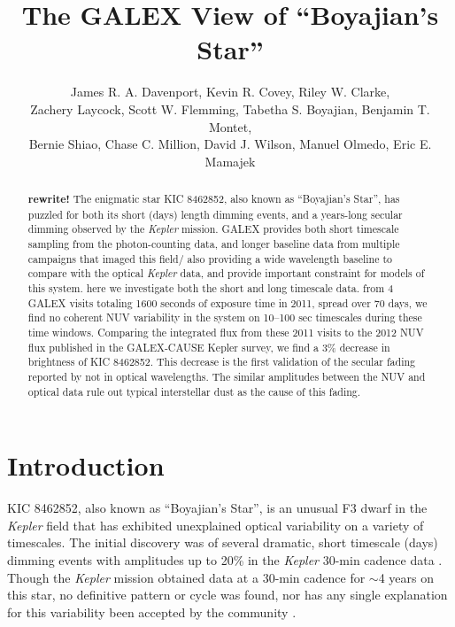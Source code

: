 \documentclass[twocolumn]{aastex6}
\newcommand{\Kepler}{\textsl{Kepler}\xspace}
\begin{document}
\title{The GALEX View of ``Boyajian's Star''}


\author{
	James R. A. Davenport,
	Kevin R. Covey,
	Riley W. Clarke, \\
	Zachery Laycock,
	Scott W. Flemming,
	Tabetha S. Boyajian,
	Benjamin T. Montet,\\
	Bernie Shiao,
	Chase C. Million,
	David J. Wilson,
	Manuel Olmedo,
	Eric E. Mamajek
	}

 

 

\begin{abstract}
{\bf rewrite!}
The enigmatic star KIC 8462852, also known as ``Boyajian's Star'',  has puzzled for both its short (days) length dimming events, and a years-long secular dimming observed by the \Kepler mission.
GALEX provides both short timescale sampling from the photon-counting data, and longer baseline data from multiple campaigns that imaged this field/ also providing a wide wavelength baseline to compare with the optical \Kepler data, and provide important constraint for models of this system.
here we investigate both the short and long timescale data. from 4 GALEX visits totaling 1600 seconds of exposure time in 2011, spread over 70 days, we find no coherent NUV variability in the system on 10--100 sec timescales during these time windows. Comparing the integrated flux from these 2011 visits to the 2012 NUV flux published in the GALEX-CAUSE Kepler survey, we find a 3\% decrease in brightness of KIC 8462852. This decrease is the first  validation of the secular fading reported by \citet{montet2016} not in optical wavelengths. The similar amplitudes between the NUV and optical data rule out typical interstellar dust as the cause of this fading.
\end{abstract}



\section{Introduction}
KIC 8462852, also known as ``Boyajian's Star'', is an unusual F3 dwarf in the \Kepler field that has exhibited unexplained optical variability on a variety of timescales. The initial discovery was of several dramatic, short timescale (days) dimming events with amplitudes up to 20\% in the \Kepler 30-min cadence data \citep{boyajian2015}. Though the \Kepler mission \citep{borucki2010} obtained data at a 30-min cadence for $\sim$4 years on this star, no definitive pattern or cycle was found, nor has any single explanation for this variability been accepted by the community \citep{wright2016b}.
\end{document}
